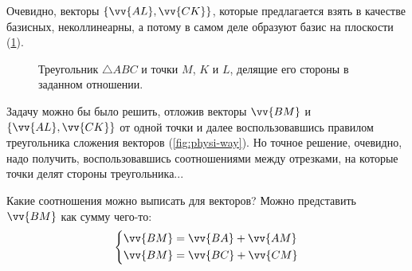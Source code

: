 \documentclass[a4paper,12pt]{article}
\begin{document}
  \begin{solution}
    Очевидно, векторы $\{\vv{AL}, \vv{CK}\}$, которые предлагается взять в качестве базисных, неколлинеарны, а потому в самом деле образуют базис на плоскости (\ref{fig:triangle-for-problem-1-21}).
    
    \begin{figure}[h]
      \centering
      
      
      \caption{Треугольник $\triangle ABC$ и точки $M$, $K$ и $L$, делящие его стороны в заданном отношении.}
      \label{fig:triangle-for-problem-1-21}
    \end{figure}
    
    Задачу можно бы было решить, отложив векторы $\vv{BM}$ и $\{\vv{AL}, \vv{CK}\}$ от одной точки и далее воспользовавшись правилом треугольника сложения векторов (\ref{fig:physi-way}).
    Но точное решение, очевидно, надо получить, воспользовавшись соотношениями между отрезками, на которые точки делят стороны треугольника...
    
    Какие соотношения можно выписать для векторов?
    Можно представить $\vv{BM}$ как сумму чего-то:
    \begin{equation}
      \label{eq:with-bm-p1-21}
      \left\{
        \begin{aligned}
          &\vv{BM} = \vv{BA} + \vv{AM}\\
          &\vv{BM} = \vv{BC} + \vv{CM}
        \end{aligned}
      \right.
    \end{equation}
    

\end{solution}
\end{document}
